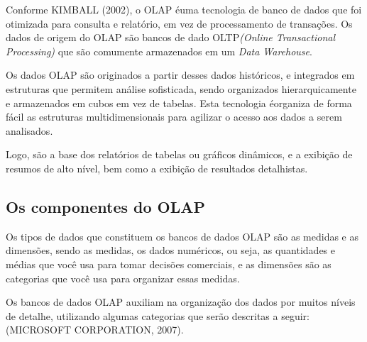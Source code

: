 Conforme KIMBALL (2002), o OLAP \'{e}uma tecnologia de banco de dados que foi otimizada para consulta e relat\'{o}rio, em vez de processamento de transa\c{c}\~{o}es. Os dados de origem do OLAP s\~{a}o bancos de dado OLTP\textit{(Online Transactional Processing)} que s\~{a}o comumente armazenados em um \textit{Data Warehouse}.

Os dados OLAP s\~{a}o originados a partir desses dados hist\'{o}ricos, e integrados em estruturas que permitem an\'{a}lise sofisticada, sendo organizados hierarquicamente e armazenados em cubos em vez de tabelas. Esta tecnologia \'{e}organiza de forma f\'{a}cil as estruturas multidimensionais para agilizar o acesso aos dados a serem analisados. 

Logo, s\~{a}o a base dos relat\'{o}rios de tabelas ou gr\'{a}ficos dinâmicos, e a exibi\c{c}\~{a}o de resumos de alto n\'{i}vel, bem como a exibi\c{c}\~{a}o de resultados detalhistas.

\subsection{Os componentes do OLAP}

Os tipos de dados que constituem os bancos de dados OLAP s\~{a}o as medidas e as dimens\~{o}es, sendo as medidas, os dados num\'{e}ricos, ou seja, as quantidades e m\'{e}dias que você usa para tomar decis\~{o}es comerciais, e as dimens\~{o}es s\~{a}o as categorias que você usa para organizar essas medidas.

Os bancos de dados OLAP auxiliam na organiza\c{c}\~{a}o dos dados por muitos n\'{i}veis de detalhe, utilizando algumas categorias que ser\~{a}o descritas a seguir: (MICROSOFT CORPORATION, 2007).

